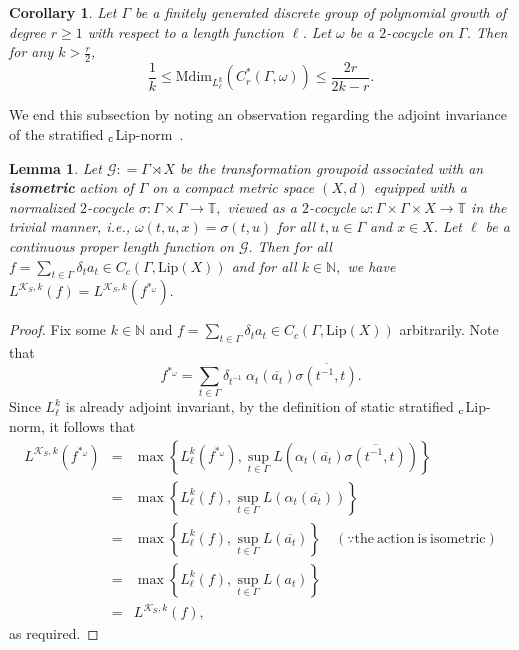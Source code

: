 \documentclass[a4paper,11pt,reqno]{amsart}
\theoremstyle{plain}
\newtheorem{cor}[thm]{Corollary}
\newtheorem{lem}[thm]{Lemma}
\theoremstyle{mainthmstyle}
\theoremstyle{named}
\numberwithin{equation}{section}
\newcommand{\Bea}{\begin{eqnarray*}}
\newcommand{\Eea}{\end{eqnarray*}}
\newcommand{\clipnorm}{$_{\text{\rm c}}$Lip-norm}
\begin{document}
\begin{cor}
 Let $\Gamma$ be a finitely generated discrete group of polynomial growth of degree $r\geq 1$ with respect to a length function $\ell$. Let $\omega$ be a $2$-cocycle on $\Gamma$. Then for any $k>\frac{r}{2}$, 
 \begin{displaymath}
     \frac{1}{k}\leq\mathrm{Mdim}_{L_{\ell}^{k}}(C^{\ast}_{r}(\Gamma,\omega))\leq \frac{2r}{2k-r}.
 \end{displaymath}
\end{cor}

We end this subsection by noting an observation regarding the adjoint invariance of the stratified \clipnorm\ .
\begin{lem}
Let $\mathcal{G} : = \Gamma \rtimes X$ be the transformation groupoid associated with an {\bf isometric} action of $\Gamma$ on a compact metric space $(X, d)$ equipped with a normalized $2$-cocycle $\sigma : \Gamma \times \Gamma \rightarrow \mathbb T,$ viewed as a $2$-cocycle $\omega : \Gamma \times \Gamma \times X \rightarrow \mathbb T$ in the trivial manner, i.e., $\omega (t, u, x) = \sigma (t, u)$ for all $t, u \in \Gamma$ and $x \in X.$ Let $\ell$ be a continuous proper length function on $\mathcal G.$ Then for all $f = \sum\limits_{t \in \Gamma} \delta_t a_t \in C_c \left (\Gamma, \mathrm {Lip} (X) \right )$ and for all $k \in \mathbb N,$ we have $L^{\mathcal K_S, k} (f) = L^{\mathcal K_S, k} (f^{\ast_{\omega}}).$ 
\end{lem}

\begin{proof}
Fix some $k \in \mathbb N$ and $f = \sum\limits_{t \in \Gamma} \delta_t a_t \in C_c (\Gamma, \mathrm {Lip} (X))$ arbitrarily. Note that $$f^{\ast_{\omega}} = \sum\limits_{t \in \Gamma} \delta_{t^{-1}}\ \alpha_{t} \left (\overline {a_t} \right ) \overline {\sigma \left (t^{-1}, t \right )}.$$ Since $L_{\ell}^{k}$ is already adjoint invariant, by the definition of static stratified \clipnorm, it follows that 
\Bea
L^{\mathcal K_S, k} \left (f^{\ast_{\omega}} \right ) & = & \max \left \{L_{\ell}^{k} \left (f^{\ast_{\omega}} \right ), \sup\limits_{t \in \Gamma} L \left (\alpha_t \left (\overline {a_t} \right ) \overline {\sigma \left (t^{-1}, t \right )} \right ) \right \} \\ & = & \max \left \{L_{\ell}^{k} (f), \sup\limits_{t \in \Gamma} L \left (\alpha_t (\overline {a_t})  \right ) \right \} \\ & = & \max \left \{L_{\ell}^{k} (f), \sup\limits_{t \in \Gamma} L \left (\overline {a_t}  \right ) \right \} \quad (\because \mathrm {the\ action\ is\ isometric}) \\ & = & \max \left \{L_{\ell}^{k} (f), \sup\limits_{t \in \Gamma} L \left (a_t \right ) \right \} \\ & = & L^{\mathcal K_S, k} (f),
\Eea
as required.
\end{proof}
\end{document}
